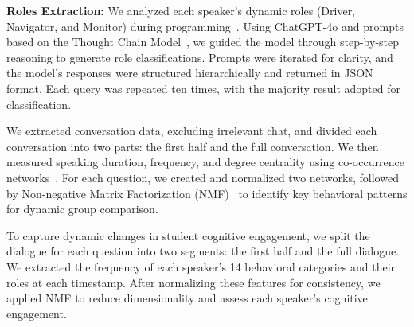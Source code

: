\textbf{Roles Extraction:}
We analyzed each speaker's dynamic roles (Driver, Navigator, and Monitor) during programming~\cite{lewis2011pair}. Using ChatGPT-4o and prompts based on the Thought Chain Model~\cite{wei2022chain}, we guided the model through step-by-step reasoning to generate role classifications. Prompts were iterated for clarity, and the model's responses were structured hierarchically and returned in JSON format. Each query was repeated ten times, with the majority result adopted for classification.

We extracted conversation data, excluding irrelevant chat, and divided each conversation into two parts: the first half and the full conversation. We then measured speaking duration, frequency, and degree centrality using co-occurrence networks~\cite{ng1999toward}. For each question, we created and normalized two networks, followed by Non-negative Matrix Factorization (NMF)~\cite{lee2000algorithms} to identify key behavioral patterns for dynamic group comparison.


To capture dynamic changes in student cognitive engagement, we split the dialogue for each question into two segments: the first half and the full dialogue. We extracted the frequency of each speaker's 14 behavioral categories and their roles at each timestamp. After normalizing these features for consistency, we applied NMF to reduce dimensionality and assess each speaker's cognitive engagement.

